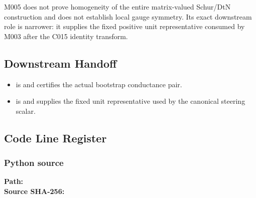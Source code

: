 M005 does not prove homogeneity of the entire matrix-valued Schur/DtN
construction and does not establish local gauge symmetry. Its exact
downstream role is narrower: it supplies the fixed positive unit
representative \texttt{\protect{}} consumed by M003 after the C015 identity
transform.

\subsection{Downstream Handoff}\label{downstream-handoff-12}

\begin{itemize}
\tightlist
\item
  \texttt{\protect{}} is
  \texttt{\protect{}} and certifies the actual bootstrap
  conductance pair.
\item
  \texttt{\protect{}} is
  \texttt{\protect{}} and supplies the fixed unit representative
  used by the canonical steering scalar.
\end{itemize}

\subsection{Code Line Register}\label{code-line-register-3}

\subsubsection{Python source}\label{python-source-11}

\textbf{Path:}
\texttt{\protect{}}\\
\textbf{Source SHA-256:}
\texttt{\protect{}}

